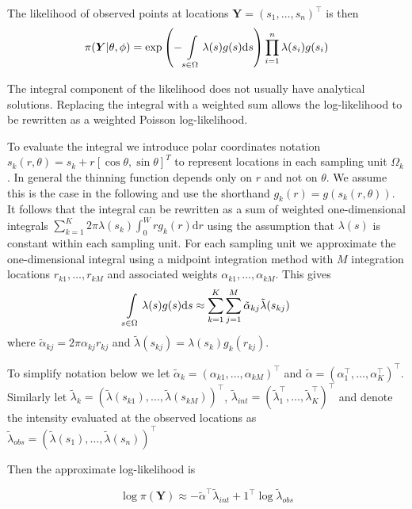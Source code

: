 \documentclass[preprint,12pt]{elsarticle}
\newcommand{\bm}{\boldsymbol}  %
\newcommand{\tl}{\tilde{\lambda}}   %
\begin{document}
The likelihood of observed points at locations $\bm{Y} = (s_1, \ldots, s_n)^\intercal$ is then
\begin{equation}
\label{lgcp-likelihood}
\pi(\bm{Y} | \theta, \phi) = \exp\left(-\int\displaylimits_{s \in \Omega} \lambda(s) g(s) \mathrm{d}s \right)\prod_{i=1}^n \lambda(s_i)g(s_i)
\end{equation}

The integral component of the likelihood does not usually have analytical solutions.  Replacing the integral with a weighted sum allows the log-likelihood to be rewritten as a weighted Poisson log-likelihood.

To evaluate the integral we introduce polar coordinates notation $s_k(r, \theta) = s_k + r\left[\cos\theta, \sin\theta \right]^T$ to represent locations in each sampling unit $\Omega_k$.   In general the thinning function depends only on $r$ and not on $\theta$.  We assume this is the case in the following and use the shorthand $g_k(r) = g(s_k(r, \theta))$. It follows that the integral can be rewritten as a sum of weighted one-dimensional integrals $\sum_{k=1}^K 2\pi \lambda(s_k) \int_0^W r g_k(r)\mathrm{d}r$ using the assumption that $\lambda(s)$ is constant within each sampling unit.  For each sampling unit we approximate the one-dimensional integral using a midpoint integration method with $M$ integration locations $r_{k1}, \ldots, r_{kM}$ and associated weights $\alpha_{k1}, \ldots, \alpha_{kM}$.  This gives
\begin{equation*}
	\int\displaylimits_{s \in \Omega} \lambda(s)g(s)\mathrm{d}s \approx \sum_{k=1}^K \sum_{j=1}^M \tilde{\alpha}_{kj} \tl(s_{kj})
\end{equation*}
where $\tilde{\alpha}_{kj} = 2\pi \alpha_{kj}r_{kj}$ and $\tl(s_{kj}) = \lambda(s_k) g_k(r_{kj})$.

To simplify notation below we let $\tilde{\alpha}_{k} = (\alpha_{k1}, \ldots, \alpha_{kM})^\intercal$ and $\tilde{\alpha} = (\alpha_1^\intercal, \ldots, \alpha_K^\intercal)^\intercal$.  Similarly let $\tl_k = (\tl(s_{k1}), \ldots, \tl(s_{kM}))^\intercal$, $\tl_{int} = (\tl_1^\intercal, \ldots, \tl_K^\intercal)^\intercal$ and denote the intensity evaluated at the observed locations as $\tl_{obs} = (\tl(s_1), \ldots, \tl(s_n))^\intercal$

Then the approximate log-likelihood is

\begin{equation}
\label{approx-log-likelihood}
	\log \pi(\bm{Y}) \approx - \tilde{\alpha}^\intercal \tl_{int} + 1^\intercal\log\tl_{obs}
\end{equation}
\end{document}
